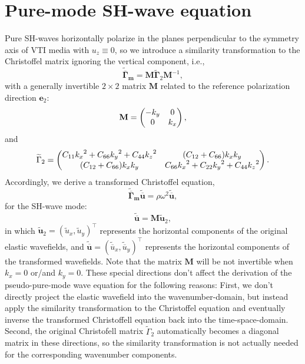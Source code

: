 \section{Pure-mode SH-wave equation}
Pure SH-waves horizontally polarize in the planes perpendicular to the symmetry axis of VTI media with
$u_z\equiv0$, so we introduce a similarity transformation to the Christoffel matrix 
ignoring the vertical component, i.e.,
\begin{equation}
\label{eq:tansChrisMsh}
\widetilde{\overline{\mathbf{\Gamma}}}_\mathbf{m} =
\mathbf{M}\widetilde{\mathbf{\Gamma}}_2\mathbf{M}^{-1},
\end{equation}
with a generally invertible $2\times2$ matrix $\mathbf{M}$ related to the reference polarization direction $\mathbf{e}_2$:
\begin{equation}
\label{eq:tansMsh}
\mathbf{M}=
\begin{pmatrix}-{k_y} & 0 \cr
	0 & {k_x} \end{pmatrix},
\end{equation}
and
\begin{equation}
\label{eq:gamma2}
\widetilde{\Gamma}_2=\begin{pmatrix}C_{11}{k_x}^2+C_{66}{k_y}^2+C_{44}{k_z}^2&
 (C_{12}+C_{66}){k_x}{k_y} \cr
 (C_{12}+C_{66}){k_x}{k_y} & C_{66}{k_x}^2+C_{22}{k_y}^2+C_{44}{k_z}^2\end{pmatrix}.
\end{equation}
Accordingly, we derive a transformed Christoffel equation,
\begin{equation}
\label{eq:tansChrissh}
\widetilde{\overline{\mathbf{\Gamma}}}_\mathbf{m}\widetilde{\overline{\mathbf{u}}}=
\rho{\omega}^2\widetilde{\overline{\mathbf{u}}},
\end{equation}
for the SH-wave mode:
\begin{equation}
\label{eq:similarTsh}
\widetilde{\overline{\mathbf{u}}}=\mathbf{M}\widetilde{\mathbf{u}}_2,
\end{equation}
in which
$\widetilde{\mathbf{u}}_2=(\widetilde{u}_x,\widetilde{u}_y)^{\top}$ represents the horizontal
components of the original elastic wavefields, and
$\widetilde{\overline{\mathbf{u}}}=(\widetilde{\overline{u}}_x,\widetilde{\overline{u}}_y)^{\top}$
represents the horizontal components of the transformed wavefields.
Note that the matrix $\mathbf{M}$ will be not invertible when $k_x=0$ or/and $k_y=0$.
These special directions don't affect the derivation of the pseudo-pure-mode wave equation for the following reasons:
First, we don't directly project the elastic wavefield into the wavenumber-domain, but instead apply the similarity transformation to the Christoffel equation
and eventually inverse the transformed Christoffell equation back into the time-space-domain.
Second, the original Christofell matrix $\widetilde{\Gamma}_2$ automatically becomes a diagonal matrix in these directions,
so the similarity transformation is not actually needed for the corresponding wavenumber components.

